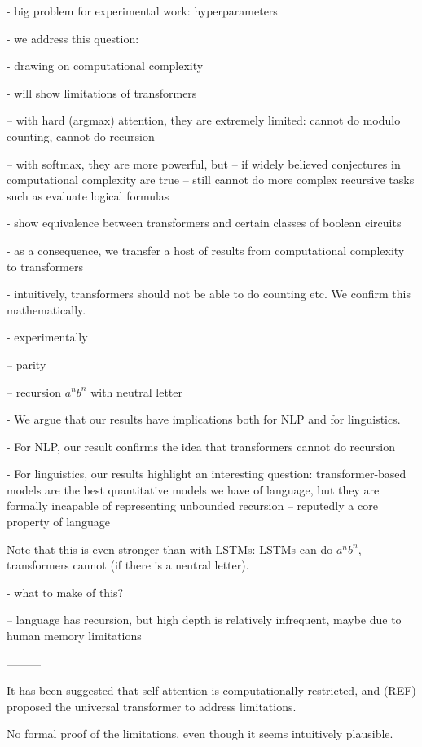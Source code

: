 \documentclass[11pt,a4paper]{article}
\begin{document}
- big problem for experimental work: hyperparameters

- we address this question:

- drawing on computational complexity

- will show limitations of transformers

-- with hard (argmax) attention, they are extremely limited: cannot do modulo counting, cannot do recursion

-- with softmax, they are more powerful, but -- if widely believed conjectures in computational complexity are true -- still cannot do more complex recursive tasks such as evaluate logical formulas

- show equivalence between transformers and certain classes of boolean circuits

- as a consequence, we transfer a host of results from computational complexity to transformers

- intuitively, transformers should not be able to do counting etc. We confirm this mathematically.

- experimentally

-- parity

-- recursion $a^nb^n$ with neutral letter

- We argue that our results have implications both for NLP and for linguistics.

- For NLP, our result confirms the idea that transformers cannot do recursion

- For linguistics, our results highlight an interesting question:
transformer-based models are the best quantitative models we have of language, but they are formally incapable of representing unbounded recursion -- reputedly a core property of language

Note that this is even stronger than with LSTMs:
LSTMs can do $a^nb^n$, transformers cannot (if there is a neutral letter).

- what to make of this?

-- language has recursion, but high depth is relatively infrequent, maybe due to human memory limitations



---------

It has been suggested that self-attention is computationally restricted, and (REF) proposed the universal transformer to address limitations.

No formal proof of the limitations, even though it seems intuitively plausible.
\end{document}
